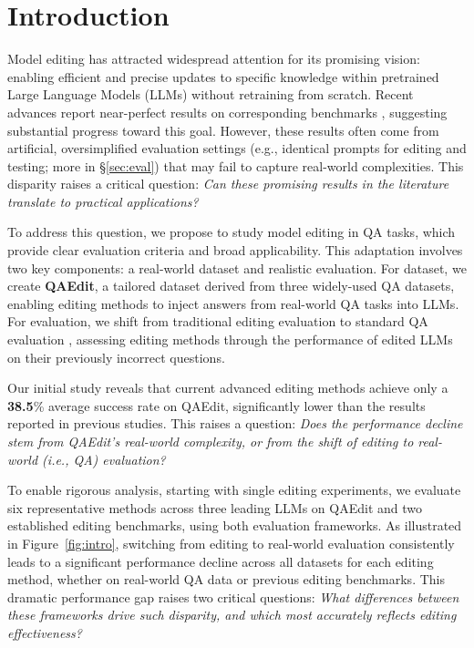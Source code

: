 \section{Introduction}

Model editing \cite{zhang2024comprehensivestudyknowledgeediting,wang2024knowledge} has attracted widespread attention for its promising vision: enabling efficient and precise updates to specific knowledge within pretrained Large Language Models (LLMs) without retraining from scratch. %
Recent advances report near-perfect results on corresponding benchmarks \cite{meng2023locating, wang2024wise}, suggesting substantial progress toward this goal.
However, these results often come from artificial, oversimplified evaluation settings (e.g., identical prompts for editing and testing; more in \S\ref{sec:eval}) that may fail to capture real-world complexities.
This disparity raises a critical question: \textit{Can these promising results in the literature translate to practical applications?}


To address this question, we propose to study model editing in QA tasks, which provide clear evaluation criteria and broad applicability.
This adaptation involves two key components: a real-world dataset and realistic evaluation.
For dataset, we create \textbf{QAEdit}, a tailored dataset derived from three widely-used QA datasets, enabling editing methods to inject answers from real-world QA tasks into LLMs.
For evaluation, we shift from traditional editing evaluation to standard QA evaluation \cite{eval-harness}, assessing editing methods through the performance of edited LLMs on their previously incorrect questions.



Our initial study reveals that current advanced editing methods achieve only a \textbf{38.5}\% average success rate on QAEdit, significantly lower than the results reported in previous studies.
This raises a question: \textit{Does the performance decline stem from QAEdit's real-world complexity, or from the shift of editing to real-world (i.e., QA) evaluation?}

To enable rigorous analysis, starting with single editing experiments, we evaluate six representative methods across three leading LLMs on QAEdit and two established editing benchmarks, using both evaluation frameworks.
As illustrated in Figure~\ref{fig:intro}, switching from editing to real-world evaluation consistently leads to a significant performance decline across all datasets for each editing method, whether on real-world QA data or previous editing benchmarks.
This dramatic performance gap raises two critical questions: \textit{What differences between these frameworks drive such disparity, and which most accurately reflects editing effectiveness?}


